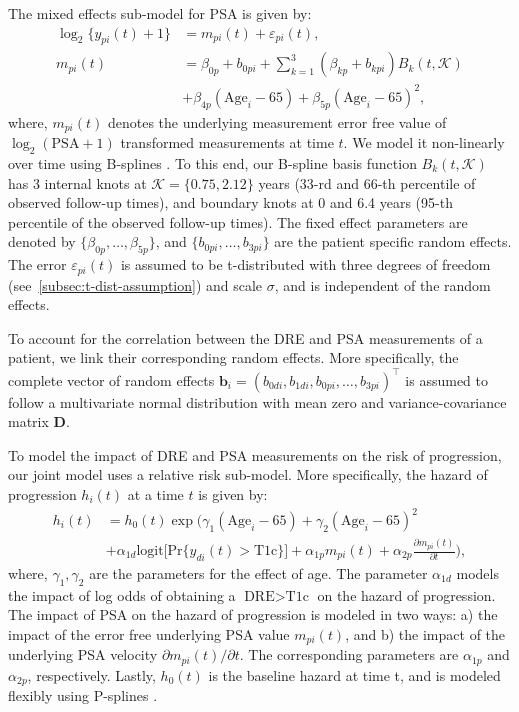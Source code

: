 The mixed effects sub-model for PSA is given by:
\begin{equation}
\label{eq:long_model_psa}
\begin{split}
    \log_2 \big\{y_{pi}(t) + 1\big\} &= m_{pi}(t) + \varepsilon_{pi}(t),\\
    m_{pi}(t) &= \beta_{0p} + b_{0pi} + \sum_{k=1}^3 (\beta_{kp} + b_{kpi})  B_k(t,\mathcal{K})\\ 
    &+ \beta_{4p} (\mbox{Age}_i-65) + \beta_{5p} (\mbox{Age}_i-65)^2,
    \end{split}
\end{equation}
where, $m_{pi}(t)$ denotes the underlying measurement error free value of $\log_2 (\mbox{PSA} + 1)$ transformed \citep{pearson1994mixed,lin2000latent} measurements at time $t$. We model it non-linearly over time using B-splines \citep{de1978practical}. To this end, our B-spline basis function $B_k(t, \mathcal{K})$ has 3 internal knots at $\mathcal{K} = \{0.75, 2.12\}$ years (33-rd and 66-th percentile of observed follow-up times), and boundary knots at 0 and 6.4 years (95-th percentile of the observed follow-up times). The fixed effect parameters are denoted by ${\{\beta_{0p},\ldots,\beta_{5p}\}}$, and ${\{b_{0pi}, \ldots, b_{3pi}\}}$ are the patient specific random effects. The error $\varepsilon_{pi}(t)$ is assumed to be t-distributed with three degrees of freedom (see~\ref{subsec:t-dist-assumption}) and scale $\sigma$, and is independent of the random effects. 

To account for the correlation between the DRE and PSA measurements of a patient, we link their corresponding random effects. More specifically, the complete vector of random effects ${\boldsymbol{b}_i = (b_{0di}, b_{1di}, b_{0pi}, \ldots, b_{3pi})^\top}$ is assumed to follow a multivariate normal distribution with mean zero and variance-covariance matrix $\boldsymbol{D}$.

To model the impact of DRE and PSA measurements on the risk of progression, our joint model uses a relative risk sub-model. More specifically, the hazard of progression $h_i(t)$ at a time $t$ is given by:
\begin{equation}
\label{eq:rel_risk_model}
\begin{split}
    h_i(t) &= h_0(t) \exp\Big(\gamma_1 (\mbox{Age}_i-65) + \gamma_2 (\mbox{Age}_i-65)^2\\
    &+\alpha_{1d} \mbox{logit} \big[\mbox{Pr}\{y_{di}(t) > \mbox{T1c}\}\big]+ \alpha_{1p} m_{pi}(t) + \alpha_{2p} \frac{\partial m_{pi}(t)}{\partial {t}}\Big),
    \end{split}
\end{equation}
where, $\gamma_1, \gamma_2$ are the parameters for the effect of age. The parameter $\alpha_{1d}$ models the impact of log odds of obtaining a $\mbox{DRE} > \mbox{T1c}$ on the hazard of progression. The impact of PSA on the hazard of progression is modeled in two ways: a) the impact of the error free underlying PSA value $m_{pi}(t)$, and b) the impact of the underlying PSA velocity $\partial m_{pi}(t)/\partial {t}$. The corresponding parameters are $\alpha_{1p}$ and $\alpha_{2p}$, respectively. Lastly, $h_0(t)$ is the baseline hazard at time t, and is modeled flexibly using P-splines \citep{eilers1996flexible}.

